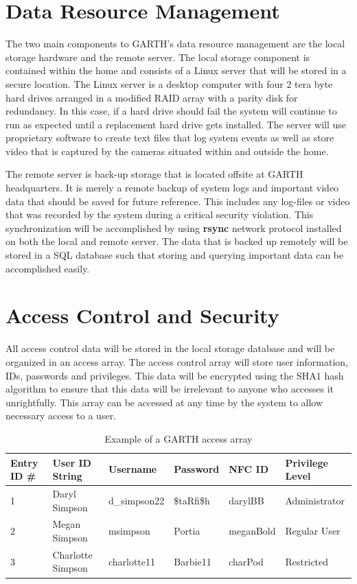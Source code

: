\documentclass{report}
\begin{document}
\section{Data Resource Management}

The two main components to GARTH's data resource management are the local
storage hardware and the remote server. The local storage component is
contained within the home and consists of a Linux server that will be stored in
a secure location. The Linux server is a desktop computer with four 2 tera byte
hard drives arranged in a modified RAID array with a parity disk for
redundancy. In this case, if a hard drive should fail the system will continue
to run as expected until a replacement hard drive gets installed. The server
will use proprietary software  to create text files that log system events as
well as store video that is captured by the cameras situated within and outside
the home.
 
The remote server is back-up storage that is located offsite at GARTH
headquarters. It is merely a remote backup of system logs and important video
data that should be saved for future reference. This includes any log-files or
video that was recorded by the system during a critical security violation. This
synchronization will be accomplished by using \textbf{rsync} network protocol
installed on both the local and remote server. The data that is backed up
remotely will be stored in a SQL database such that storing and querying
important data can be accomplished easily.

\section{Access Control and Security}

All access control data will be stored in the local storage database and will be
organized in an access array. The access control array will store user
information, IDs, passwords and privileges.  This data will be encrypted using
the SHA1 hash algorithm to ensure that this data will be irrelevant to anyone
who accesses it unrightfully. This array can be accessed at any time by the
system to allow necessary access to a user. 

\begin{table}[h]
    \caption{Example of a GARTH access array}
    \label{access_array}
    \centering
    \begin{tabular}{| l | l | l | l | l | l |}
    \hline
    \textbf{Entry ID \#}&\textbf{User ID String}&\textbf{Username}&
    \textbf{Password}&\textbf{NFC ID}&\textbf{Privilege Level} \\ \hline
    1&Daryl Simpson&d\_simpson22&\$taRfi\$h&darylBB&Administrator \\ \hline
    2&Megan Simpson&msimpson&Portia&meganBold&Regular User \\ \hline
    3&Charlotte Simpson&charlotte11&Barbie11&charPod&Restricted \\
    \hline
    \end{tabular}
\end{table}
\end{document}
